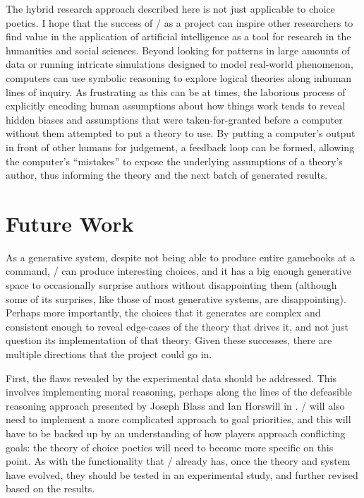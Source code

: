 The hybrid research approach described here is not just applicable to choice poetics.
%
I hope that the success of \dunyazad/ as a project can inspire other researchers to find value in the application of artificial intelligence as a tool for research in the humanities and social sciences.
%
Beyond looking for patterns in large amounts of data or running intricate simulations designed to model real-world phenomenon, computers can use symbolic reasoning to explore logical theories along inhuman lines of inquiry.
%
As frustrating as this can be at times, the laborious process of explicitly encoding human assumptions about how things work tends to reveal hidden biases and assumptions that were taken-for-granted before a computer without them attempted to put a theory to use.
%
By putting a computer's output in front of other humans for judgement, a feedback loop can be formed, allowing the computer's ``mistakes'' to expose the underlying assumptions of a theory's author, thus informing the theory and the next batch of generated results.


\section{Future Work}

As a generative system, despite not being able to produce entire gamebooks at a command, \dunyazad/ can produce interesting choices, and it has a big enough generative space to occasionally surprise authors without disappointing them (although some of its surprises, like those of most generative systems, are disappointing).
%
Perhaps more importantly, the choices that it generates are complex and consistent enough to reveal edge-cases of the theory that drives it, and not just question its implementation of that theory.
%
Given these successes, there are multiple directions that the project could go in.


First, the flaws revealed by the experimental data should be addressed.
%
This involves implementing moral reasoning, perhaps along the lines of the defeasible reasoning approach presented by Joseph Blass and Ian Horswill in \citep{Blass2015}.
%
\dunyazad/ will also need to implement a more complicated approach to goal priorities, and this will have to be backed up by an understanding of how players approach conflicting goals: the theory of choice poetics will need to become more specific on this point.
%
As with the functionality that \dunyazad/ already has, once the theory and system have evolved, they should be tested in an experimental study, and further revised based on the results.


